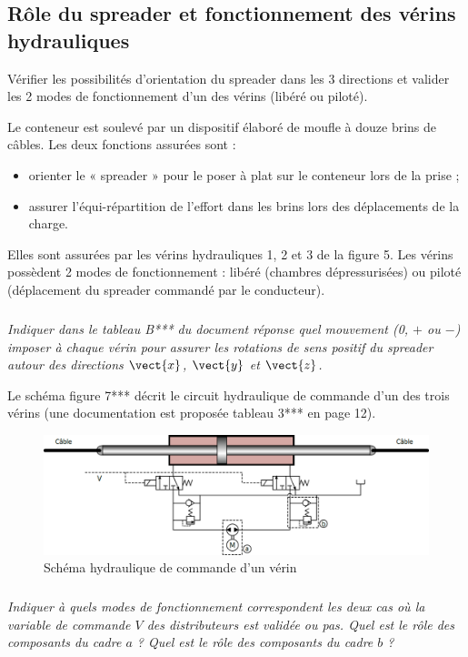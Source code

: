\documentclass[10pt,fleqn]{article} %
\begin{document}
\subsection{Rôle du spreader et fonctionnement des vérins hydrauliques}
\begin{obj}
Vérifier les possibilités d’orientation du spreader dans les 3 directions et valider les 2 modes de
fonctionnement d’un des vérins (libéré ou piloté).
\end{obj}
Le conteneur est soulevé par un dispositif élaboré de moufle à douze brins de câbles. Les deux fonctions assurées
sont :
\begin{itemize}
\item orienter le « spreader » pour le poser à plat sur le conteneur lors de la prise ;
\item assurer l’équi-répartition de l’effort dans les brins lors des déplacements de la charge.
\end{itemize}
Elles sont assurées par les vérins hydrauliques 1, 2 et 3 de la figure 5. Les vérins possèdent 2 modes de fonctionnement
: libéré (chambres dépressurisées) ou piloté (déplacement du spreader commandé par le conducteur).

\subparagraph{\label{q08}}\textit{Indiquer dans le tableau B*** du document réponse quel mouvement (0, $+$ ou $-$) imposer à chaque vérin
pour assurer les rotations de sens positif du spreader autour des directions $\vect{x}$, $\vect{y}$ et $\vect{z}$.}

Le schéma figure 7*** décrit le circuit hydraulique de commande d’un des trois vérins
(une documentation est proposée tableau 3*** en page 12).

\begin{figure}[H]
\centering
\includegraphics[width=.8\linewidth]{images/fig_07}
\caption{Schéma hydraulique de commande d’un vérin \label{fig_07}}
\end{figure}

\subparagraph{\label{q09}}\textit{Indiquer à quels modes de fonctionnement correspondent les deux cas où la variable de commande $V$
des distributeurs est validée ou pas. Quel est le rôle des composants du cadre $a$ ? Quel est le rôle des composants
du cadre $b$ ?}
\end{document}
